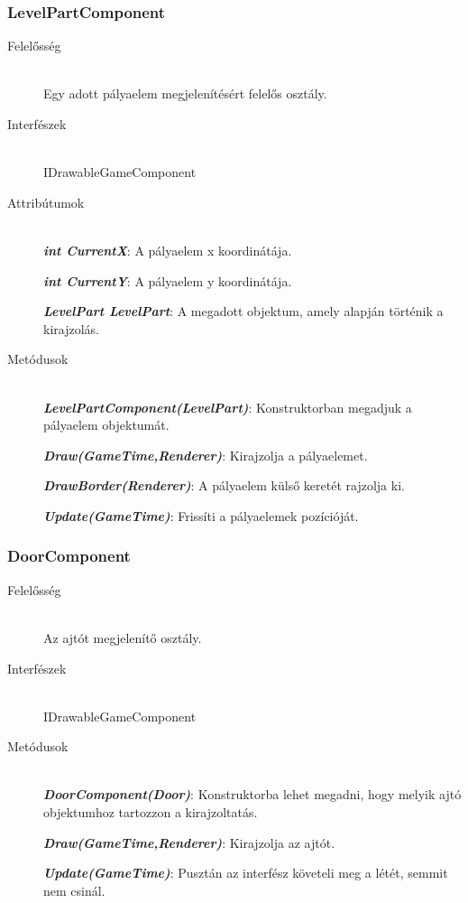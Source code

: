 \subsubsection{LevelPartComponent}
	\begin{description}
		\item[Felelősség] \hfill \\
		Egy adott pályaelem megjelenítésért felelős osztály.
		\item[Interfészek] \hfill \\
		IDrawableGameComponent

		\item[Attribútumok] \hfill \\
		\textbf{\emph{int CurrentX}}: A pályaelem x koordinátája.

		\textbf{\emph{int CurrentY}}: A pályaelem y koordinátája.

		\textbf{\emph{LevelPart LevelPart}}: A megadott objektum, amely alapján történik a kirajzolás.
		
		\item[Metódusok] \hfill \\
		\textbf{\emph{LevelPartComponent(LevelPart)}}: Konstruktorban megadjuk a pályaelem objektumát.

		\textbf{\emph{Draw(GameTime,Renderer)}}: Kirajzolja a pályaelemet.

		\textbf{\emph{DrawBorder(Renderer)}}: A pályaelem külső keretét rajzolja ki.

		\textbf{\emph{Update(GameTime)}}: Frissíti a pályaelemek pozícióját.
	\end{description}	
	
\subsubsection{DoorComponent}
	\begin{description}
		\item[Felelősség] \hfill \\
		Az ajtót megjelenítő osztály.
		\item[Interfészek] \hfill \\
		IDrawableGameComponent

		\item[Metódusok] \hfill \\
		\textbf{\emph{DoorComponent(Door)}}: Konstruktorba lehet megadni, hogy melyik ajtó objektumhoz tartozzon a kirajzoltatás.

		\textbf{\emph{Draw(GameTime,Renderer)}}: Kirajzolja az ajtót.

		\textbf{\emph{Update(GameTime)}}: Pusztán az interfész követeli meg a létét, semmit nem csinál.
	\end{description}
	
